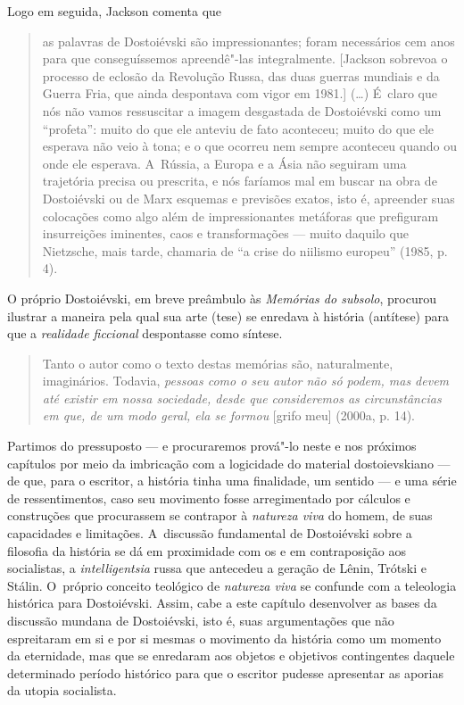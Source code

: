 Logo em seguida, Jackson comenta que

\begin{quote}
as palavras de Dostoiévski são impressionantes; foram necessários cem
anos para que conseguíssemos apreendê"-las integralmente. {[}Jackson
sobrevoa o processo de eclosão da Revolução Russa, das duas guerras
mundiais e da Guerra Fria, que ainda despontava com vigor em 1981.{]}
(\ldots) É~claro que nós não vamos ressuscitar a imagem desgastada de
Dostoiévski como um ``profeta'': muito do que ele anteviu de fato
aconteceu; muito do que ele esperava não veio à tona; e o que ocorreu
nem sempre aconteceu quando ou onde ele esperava. A~Rússia, a Europa e a
Ásia não seguiram uma trajetória precisa ou prescrita, e nós faríamos
mal em buscar na obra de Dostoiévski ou de Marx esquemas e previsões
exatos, isto é, apreender suas colocações como algo além de
impressionantes metáforas que prefiguram insurreições iminentes, caos e
transformações --- muito daquilo que Nietzsche, mais tarde, chamaria de
``a crise do niilismo europeu'' (1985, p. 4).
\end{quote}

O próprio Dostoiévski, em breve preâmbulo às \emph{Memórias do subsolo},
procurou ilustrar a maneira pela qual sua arte (tese) se enredava à
história (antítese) para que a \emph{realidade ficcional} despontasse
como síntese.

\begin{quote}
Tanto o autor como o texto destas memórias são, naturalmente,
imaginários. Todavia, \emph{pessoas como o seu autor não só podem, mas
devem até existir em nossa sociedade, desde que consideremos as
circunstâncias em que, de um modo geral, ela se formou} {[}grifo meu{]}
(2000a, p. 14).
\end{quote}

Partimos do pressuposto --- e procuraremos prová"-lo neste e nos próximos
capítulos por meio da imbricação com a logicidade do material
dostoievskiano --- de que, para o escritor, a história tinha uma
finalidade, um sentido --- e uma série de ressentimentos, caso seu
movimento fosse arregimentado por cálculos e construções que procurassem
se contrapor à \emph{natureza viva} do homem, de suas capacidades e
limitações. A~discussão fundamental de Dostoiévski sobre a filosofia da
história se dá em proximidade com os e em contraposição aos socialistas,
a \emph{intelligentsia} russa que antecedeu a geração de Lênin, Trótski
e Stálin. O~próprio conceito teológico de \emph{natureza viva} se
confunde com a teleologia histórica para Dostoiévski. Assim, cabe a este
capítulo desenvolver as bases da discussão mundana de Dostoiévski, isto
é, suas argumentações que não espreitaram em si e por si mesmas o
movimento da história como um momento da eternidade, mas que se
enredaram aos objetos e objetivos contingentes daquele determinado
período histórico para que o escritor pudesse apresentar as aporias da
utopia socialista.

